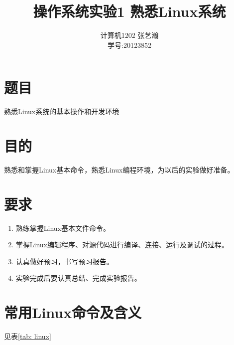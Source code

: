 \documentclass[11pt]{article}
\begin{document}
\title{操作系统实验1 \quad 熟悉Linux系统}
\author{计算机1202 \quad 张艺瀚\\学号:20123852}
\maketitle

\thispagestyle{fancy}
\normalsize

\section{题目}
熟悉Linux系统的基本操作和开发环境

\section{目的}
熟悉和掌握Linux基本命令，熟悉Linux编程环境，为以后的实验做好准备。

\section{要求}
\begin{enumerate}
\item 熟练掌握Linux基本文件命令。
\item 掌握Linux编辑程序、对源代码进行编译、连接、运行及调试的过程。
\item 认真做好预习，书写预习报告。
\item 实验完成后要认真总结、完成实验报告。
\end{enumerate}

\section{常用Linux命令及含义}
见表\ref{tab: linux}
\end{document}
